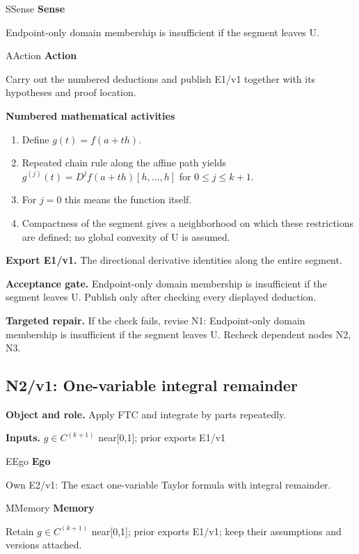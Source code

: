 \documentclass[preprint,12pt,aps,pra,showkeys,amsmath,amssymb,superscriptaddress,floatfix]{revtex4-2}
\theoremstyle{definition}
\theoremstyle{remark}
\newcommand{\mmfaculty}[3]{%
 \begin{mmfacultybox}{#1}{#2}
 {\sffamily\bfseries\color{MMBlue}#2}\par\smallskip #3
 \end{mmfacultybox}}
\newcommand{\field}[2]{\par\smallskip\noindent\textbf{#1.} #2\par}
\begin{document}
\mmfaculty{S}{Sense}{Endpoint-only domain membership is insufficient if the segment leaves U.}

\mmfaculty{A}{Action}{Carry out the numbered deductions and publish E1/v1 together with its
hypotheses and proof location.}

\smallskip\noindent\textbf{Numbered mathematical activities}

\begin{enumerate}[label=N1.\arabic*,leftmargin=3.4em]

\item Define \(g(t)=f(a+th)\).

\item Repeated chain rule along the affine path yields
\(g^{(j)}(t)=D^jf(a+th)[h,\ldots ,h]\) for \(0\le j\le k+1\).

\item For \(j=0\) this means the function itself.

\item Compactness of the segment gives a neighborhood on which these
restrictions are defined; no global convexity of U is assumed.

\end{enumerate}

\field{Export E1/v1}{The directional derivative identities along the entire segment.}

\field{Acceptance gate}{Endpoint-only domain membership is insufficient if the segment leaves U.
Publish only after checking every displayed deduction.}

\field{Targeted repair}{If the check fails, revise N1: Endpoint-only domain membership is
insufficient if the segment leaves U. Recheck dependent nodes N2, N3.}

\clearpage

\subsection{N2/v1: One-variable integral remainder}

\field{Object and role}{Apply FTC and integrate by parts repeatedly.}

\field{Inputs}{\(g\in C^{(k+1)}\) near{[}0,1{]}; prior exports E1/v1}

\mmfaculty{E}{Ego}{Own E2/v1: The exact one-variable Taylor formula with integral
remainder.}

\mmfaculty{M}{Memory}{Retain \(g\in C^{(k+1)}\) near{[}0,1{]}; prior exports E1/v1; keep their
assumptions and versions attached.}
\end{document}
